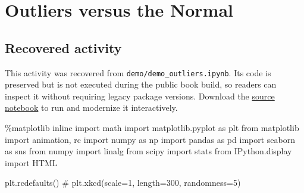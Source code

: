 \documentclass[
  letterpaper,
]{scrbook}
\newenvironment{Shaded}{\begin{snugshade}}{\end{snugshade}}
\newcommand{\CommentTok}[1]{\textcolor[rgb]{0.37,0.37,0.37}{#1}}
\newcommand{\ImportTok}[1]{\textcolor[rgb]{0.00,0.46,0.62}{#1}}
\newcommand{\NormalTok}[1]{\textcolor[rgb]{0.00,0.23,0.31}{#1}}
\newcommand{\OperatorTok}[1]{\textcolor[rgb]{0.37,0.37,0.37}{#1}}
\begin{document}
\chapter*{Outliers versus the Normal}\label{ch-lab-outliers}


\section*{Recovered activity}\label{sec-lab-outliers}


\begin{tcolorbox}[enhanced jigsaw, arc=.35mm, bottomrule=.15mm, bottomtitle=1mm, breakable, colback=white, colbacktitle=quarto-callout-note-color!10!white, colframe=quarto-callout-note-color-frame, coltitle=black, left=2mm, leftrule=.75mm, opacityback=0, opacitybacktitle=0.6, rightrule=.15mm, title=\textcolor{quarto-callout-note-color}{\faInfo}\hspace{0.5em}{Historical source and execution note}, titlerule=0mm, toprule=.15mm, toptitle=1mm]

This activity was recovered from \texttt{demo/demo\_outliers.ipynb}. Its
code is preserved but is not executed during the public book build, so
readers can inspect it without requiring legacy package versions.
Download the \href{../notebooks/outliers.ipynb}{source notebook} to run
and modernize it interactively.

\end{tcolorbox}

\begin{Shaded}
\begin{Highlighting}[]
\OperatorTok{\%}\NormalTok{matplotlib inline}
\ImportTok{import}\NormalTok{ math}
\ImportTok{import}\NormalTok{ matplotlib.pyplot }\ImportTok{as}\NormalTok{ plt}
\ImportTok{from}\NormalTok{ matplotlib }\ImportTok{import}\NormalTok{ animation, rc}
\ImportTok{import}\NormalTok{ numpy }\ImportTok{as}\NormalTok{ np}
\ImportTok{import}\NormalTok{ pandas }\ImportTok{as}\NormalTok{ pd}
\ImportTok{import}\NormalTok{ seaborn }\ImportTok{as}\NormalTok{ sns}
\ImportTok{from}\NormalTok{ numpy }\ImportTok{import}\NormalTok{ linalg}
\ImportTok{from}\NormalTok{ scipy }\ImportTok{import}\NormalTok{ stats}
\ImportTok{from}\NormalTok{ IPython.display }\ImportTok{import}\NormalTok{ HTML}

\NormalTok{plt.rcdefaults()}
\CommentTok{\# plt.xkcd(scale=1, length=300, randomness=5)}
\end{Highlighting}
\end{Shaded}
\end{document}
